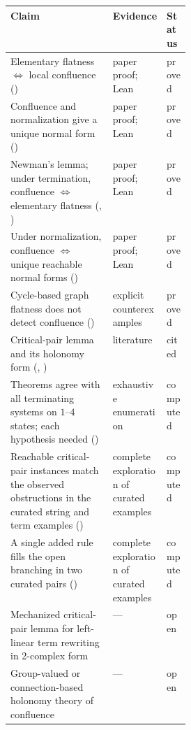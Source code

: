 \small
\setlength{\tabcolsep}{5pt}
\renewcommand{\arraystretch}{1.15}
\begin{tabularx}{\linewidth}{@{}Y L{0.30\linewidth} l@{}}
\toprule
Claim & Evidence & Status \\
\midrule
Elementary flatness $\iff$ local confluence () & paper proof; Lean & proved \\
Confluence and normalization give a unique normal form () & paper proof; Lean & proved \\
Newman's lemma; under termination, confluence $\iff$ elementary flatness (, ) & paper proof; Lean & proved \\
Under normalization, confluence $\iff$ unique reachable normal forms () & paper proof; Lean & proved \\
Cycle-based graph flatness does not detect confluence () & explicit counterexamples & proved \\
Critical-pair lemma and its holonomy form (, ) & literature \cite{KnuthBendix1970,Huet1980} & cited \\
Theorems agree with all terminating systems on $1$--$4$ states; each hypothesis needed () & exhaustive enumeration & computed \\
Reachable critical-pair instances match the observed obstructions in the curated string and term examples () & complete exploration of curated examples & computed \\
A single added rule fills the open branching in two curated pairs () & complete exploration of curated examples & computed \\
Mechanized critical-pair lemma for left-linear term rewriting in 2-complex form & --- & open \\
Group-valued or connection-based holonomy theory of confluence & --- & open \\
\bottomrule
\end{tabularx}
